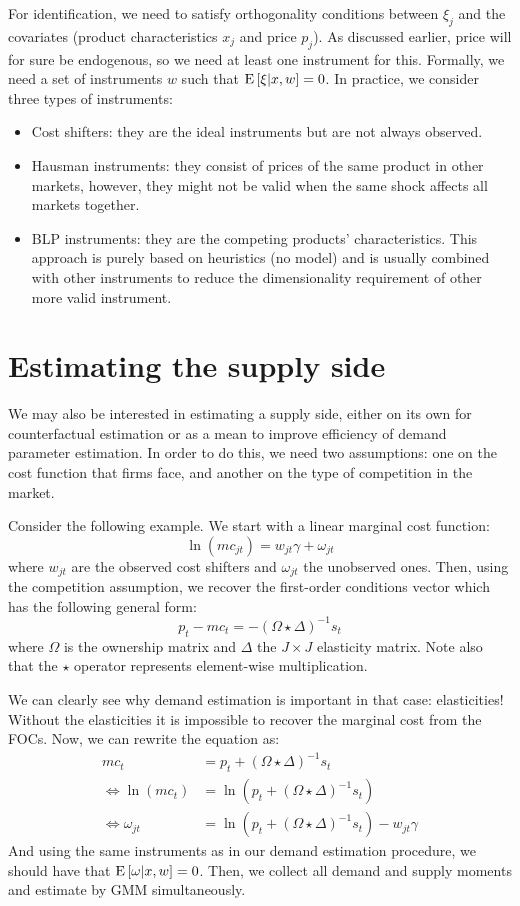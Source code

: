 For identification, we need to satisfy orthogonality conditions between $\xi_j$ and the covariates (product characteristics $x_j$ and price $p_j$). As discussed earlier, price will for sure be endogenous, so we need at least one instrument for this. Formally, we need a set of instruments $w$ such that $\operatorname{E}\left[\xi|x, w\right] = 0$.  In practice, we consider three types of instruments:\begin{itemize}
\item Cost shifters: they are the ideal instruments but are not always observed.
\item Hausman instruments: they consist of prices of the same product in other markets, however, they might not be valid when the same shock affects all markets together.
\item BLP instruments: they are the competing products' characteristics. This approach is purely based on heuristics (no model) and is usually combined with other instruments to reduce the dimensionality requirement of other more valid instrument.
\end{itemize}

\section{Estimating the supply side}\label{sec:supplyside}

We may also be interested in estimating a supply side, either on its own for counterfactual estimation or as a mean to improve efficiency of demand parameter estimation. In order to do this, we need two assumptions: one on the cost function that firms face, and another on the type of competition in the market.

Consider the following example. We start with a linear marginal cost function: $$\ln(mc_{jt}) = w_{jt}\gamma + \omega_{jt} $$ where $w_{jt}$ are the observed cost shifters and $\omega_{jt}$ the unobserved ones. Then, using the competition assumption, we recover the first-order conditions vector which has the following general form: $$ p_t - mc_t = - (\Omega \star \Delta)^{-1} s_t $$ where $\Omega$ is the ownership matrix and $\Delta$ the $J\times J$ elasticity matrix. Note also that the $\star$ operator represents element-wise multiplication.

We can clearly see why demand estimation is important in that case: elasticities! Without the elasticities it is impossible to recover the marginal cost from the FOCs. Now, we can rewrite the equation as: \begin{align*}
mc_t  & = p_t + (\Omega \star \Delta)^{-1} s_t \\
 \Leftrightarrow \ln(mc_t) & = \ln(p_t + (\Omega \star \Delta)^{-1} s_t) \\ \Leftrightarrow \omega_{jt} & = \ln(p_t + (\Omega \star \Delta)^{-1} s_t) - w_{jt}\gamma
\end{align*} 
And using the same instruments as in our demand estimation procedure, we should have that $\operatorname{E}\left[\omega|x, w\right] = 0$. Then, we collect all demand and supply moments and estimate by GMM simultaneously.
